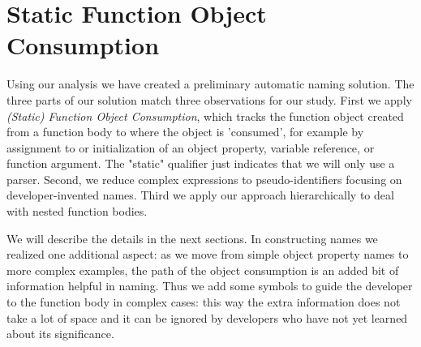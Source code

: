 \documentclass[10pt, preprint]{sigplanconf}
\begin{document}
\section{Static  Function Object Consumption}
\label{sec:foc}
Using our analysis we have created a preliminary automatic naming solution.  The three parts of our solution match three observations for our study. First we apply 
 \textit{(Static) Function Object Consumption}, which tracks the function object created from a function body to where the object is 'consumed', for example by assignment to or initialization of  an object property, variable reference, or function argument. The "static" qualifier just indicates that we will only use a parser.  Second, we reduce complex expressions to pseudo-identifiers focusing on developer-invented names.  Third we apply our approach hierarchically to  deal with nested function bodies.

We will describe the details in the next sections. In constructing names we realized one additional aspect: as we move from simple object property names to more complex examples, the path of the object consumption is an added bit of information helpful in naming. Thus we add some symbols to guide the developer to the function body in complex cases: this way the extra information does not take a lot of space and it can be ignored by developers who have not yet learned about its significance.


 
\end{document}
